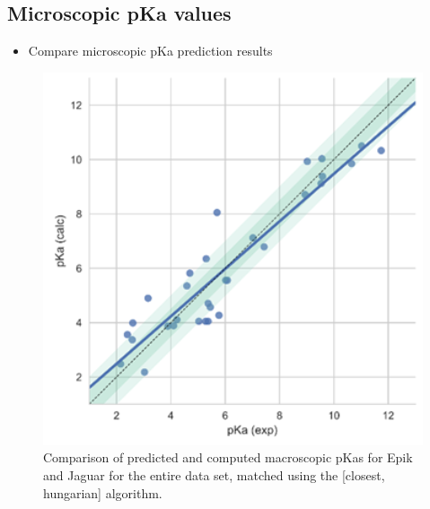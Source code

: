 \documentclass[9pt,lineno]{elife}
\begin{document}
\subsection{Microscopic pKa values}
\begin{itemize}
    \item Compare microscopic pKa prediction results
\end{itemize}
\begin{figure}[H]
    \centering
    \includegraphics[]{correlationplot.png}
    \caption{Comparison of predicted and computed macroscopic pKas for Epik and Jaguar for the entire data set, matched using the [closest, hungarian] algorithm.}
    \label{fig:correlation-micro}
\end{figure}
\end{document}
